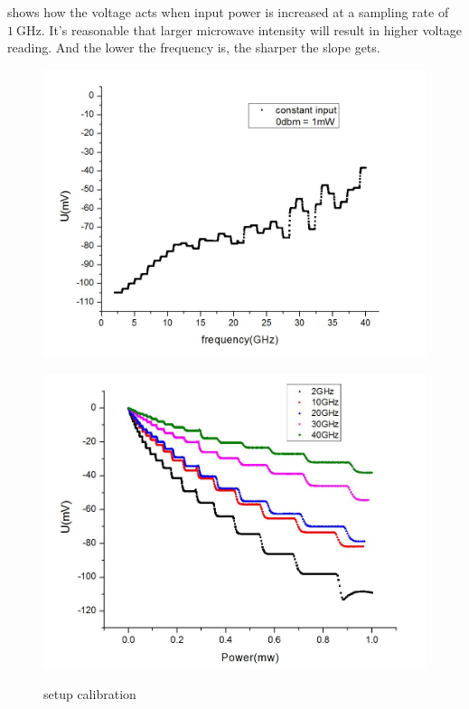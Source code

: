 \documentclass[12pt]{ruthesis}
\begin{document}
 shows how the voltage acts when input power is increased at a sampling rate of $\SI{1}{\giga \hertz}$. It's reasonable that larger microwave intensity will result in higher voltage reading. And the lower the frequency is, the sharper the slope gets. 

\begin{figure}[!htb]\centering
   \begin{minipage}{0.49\textwidth}
     \includegraphics[width=\linewidth]{figures/spec.JPG}
     \label{spec}
   \end{minipage}
   \begin {minipage}{0.49\textwidth}
     \includegraphics[width=\linewidth]{figures/multifre.JPG}
     \label{multifre}
   \end{minipage}
   \caption{setup calibration}
\end{figure}
\end{document}
